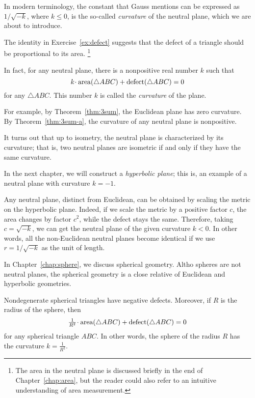 In modern terminology, the constant that Gauss mentions 
can be expressed as $1/\sqrt{-k}$, 
where $k\le 0$, is the so-called \emph{curvature} of the neutral plane, which we are about to introduce.

The identity in Exercise~\ref{ex:defect} suggests that the defect of a triangle should be proportional to its area.%
\footnote{The area in the neutral plane is discussed briefly in the end of Chapter~\ref{chap:area},
but the reader could also refer to an intuitive understanding of area measurement.}

In fact, for any neutral plane, there is a nonpositive real number $k$
such that 
$$k\cdot\area(\triangle ABC)+\defect(\triangle ABC)=0$$
for any $\triangle ABC$.
This number $k$ is called the \emph{curvature} of the plane.

For example, by Theorem~\ref{thm:3sum}, the Euclidean plane has zero curvature.
By Theorem~\ref{thm:3sum-a}, the curvature of any neutral plane is nonpositive.

It turns out that up to isometry, the neutral plane is characterized by its curvature;
that is, two neutral planes are isometric if and only if they have the same curvature. 

In the next chapter, we will construct a {}\emph{hyperbolic plane};
this is, an example of a neutral plane with curvature $k=-1$.

Any neutral plane, distinct from Euclidean,
can be obtained by scaling the metric on the hyperbolic plane.
Indeed,
if we scale the metric by a positive factor $c$,
the area changes by factor $c^2$, while the defect stays the same.
Therefore, taking $c=\sqrt{-k}$,
we can get the neutral plane of the given curvature $k<0$.
In other words, all the non-Euclidean neutral planes become identical
if we use $r=1/\sqrt{-k}$ as the unit of length.

\medskip

In Chapter~\ref{chap:sphere}, we discuss spherical geometry.
Altho spheres are not neutral planes,
the spherical geometry is a close relative of Euclidean and hyperbolic geometries.

Nondegenerate spherical triangles have negative defects.
Moreover, 
if $R$ is the radius of the sphere, then
$$\tfrac1{R^2}\cdot\area(\triangle ABC)+\defect(\triangle ABC)=0$$
for any spherical triangle $ABC$.
In other words, 
the sphere of the radius $R$ has the curvature $k=\tfrac1{R^2}$.


